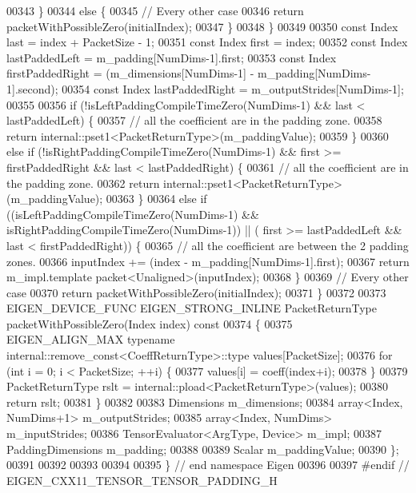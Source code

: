 \begin{DoxyCode}
00343       \}
00344       \textcolor{keywordflow}{else} \{
00345         \textcolor{comment}{// Every other case}
00346         \textcolor{keywordflow}{return} packetWithPossibleZero(initialIndex);
00347       \}
00348     \}
00349 
00350     \textcolor{keyword}{const} Index last = index + PacketSize - 1;
00351     \textcolor{keyword}{const} Index first = index;
00352     \textcolor{keyword}{const} Index lastPaddedLeft = m\_padding[NumDims-1].first;
00353     \textcolor{keyword}{const} Index firstPaddedRight = (m\_dimensions[NumDims-1] - m\_padding[NumDims-1].second);
00354     \textcolor{keyword}{const} Index lastPaddedRight = m\_outputStrides[NumDims-1];
00355 
00356     \textcolor{keywordflow}{if} (!isLeftPaddingCompileTimeZero(NumDims-1) && last < lastPaddedLeft) \{
00357       \textcolor{comment}{// all the coefficient are in the padding zone.}
00358       \textcolor{keywordflow}{return} internal::pset1<PacketReturnType>(m\_paddingValue);
00359     \}
00360     \textcolor{keywordflow}{else} \textcolor{keywordflow}{if} (!isRightPaddingCompileTimeZero(NumDims-1) && first >= firstPaddedRight && last < 
      lastPaddedRight) \{
00361       \textcolor{comment}{// all the coefficient are in the padding zone.}
00362       \textcolor{keywordflow}{return} internal::pset1<PacketReturnType>(m\_paddingValue);
00363     \}
00364     \textcolor{keywordflow}{else} \textcolor{keywordflow}{if} ((isLeftPaddingCompileTimeZero(NumDims-1) && isRightPaddingCompileTimeZero(NumDims-1)) || (
      first >= lastPaddedLeft && last < firstPaddedRight)) \{
00365       \textcolor{comment}{// all the coefficient are between the 2 padding zones.}
00366       inputIndex += (index - m\_padding[NumDims-1].first);
00367       \textcolor{keywordflow}{return} m\_impl.template packet<Unaligned>(inputIndex);
00368     \}
00369     \textcolor{comment}{// Every other case}
00370     \textcolor{keywordflow}{return} packetWithPossibleZero(initialIndex);
00371   \}
00372 
00373   EIGEN\_DEVICE\_FUNC EIGEN\_STRONG\_INLINE PacketReturnType packetWithPossibleZero(Index index)\textcolor{keyword}{ const}
00374 \textcolor{keyword}{  }\{
00375     EIGEN\_ALIGN\_MAX \textcolor{keyword}{typename} internal::remove\_const<CoeffReturnType>::type values[PacketSize];
00376     \textcolor{keywordflow}{for} (\textcolor{keywordtype}{int} i = 0; i < PacketSize; ++i) \{
00377       values[i] = coeff(index+i);
00378     \}
00379     PacketReturnType rslt = internal::pload<PacketReturnType>(values);
00380     \textcolor{keywordflow}{return} rslt;
00381   \}
00382 
00383   Dimensions m\_dimensions;
00384   array<Index, NumDims+1> m\_outputStrides;
00385   array<Index, NumDims> m\_inputStrides;
00386   TensorEvaluator<ArgType, Device> m\_impl;
00387   PaddingDimensions m\_padding;
00388 
00389   Scalar m\_paddingValue;
00390 \};
00391 
00392 
00393 
00394 
00395 \} \textcolor{comment}{// end namespace Eigen}
00396 
00397 \textcolor{preprocessor}{#endif // EIGEN\_CXX11\_TENSOR\_TENSOR\_PADDING\_H}
\end{DoxyCode}
